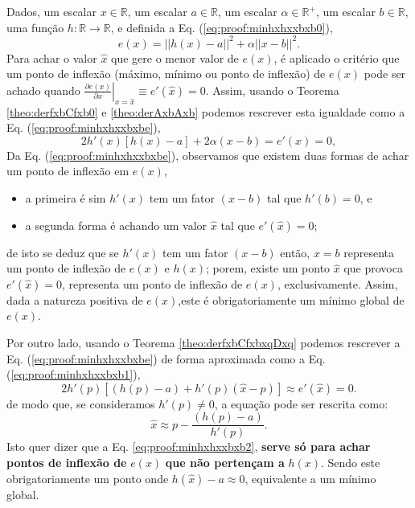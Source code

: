 \begin{myproofT}\label{proof:theo:minhxhxxbxb}
Dados,
um escalar $x \in \mathbb{R}$, 
um escalar $a \in \mathbb{R}$,
um escalar $\alpha \in \mathbb{R}^{+}$,
um escalar $b \in \mathbb{R}$,
uma função $h:\mathbb{R} \rightarrow \mathbb{R}$, e 
definida a Eq. (\ref{eq:proof:minhxhxxbxb0}),
\begin{equation}\label{eq:proof:minhxhxxbxb0}
e(x)=||h(x)-a||^2+\alpha ||x-b||^2.
\end{equation}
Para achar o valor  $\hat{x}$ que gere o menor valor de $e(x)$, é aplicado
o critério que um ponto de inflexão (máximo, mínimo ou ponto de inflexão) de $e(x)$ pode ser achado quando 
$\left. \frac{\partial e(x)}{\partial x }\right|_{x=\hat{x}} \equiv e'(\hat{x}) =0$.
Assim, 
usando o Teorema \ref{theo:derfxbCfxb0} e \ref{theo:derAxbAxb} podemos 
rescrever esta igualdade como a Eq. (\ref{eq:proof:minhxhxxbxbe}),
\begin{equation}\label{eq:proof:minhxhxxbxbe}
2  h'(x) \left[h(x) -a\right]+2\alpha (x-b)= e'(x)=0,
\end{equation}
Da Eq. (\ref{eq:proof:minhxhxxbxbe}), observamos 
que existem duas formas de achar um ponto de inflexão em $e(x)$,
\begin{itemize}
 \item a primeira é sim $h'(x)$ tem um fator $(x-b)$ tal que $h'(b)=0$, e
 \item a segunda forma é achando um valor $\hat{x}$ tal que $e'(\hat{x})=0$;
\end{itemize}
de isto se deduz que se $h'(x)$ tem um fator $(x-b)$ então, $x=b$ representa um ponto de inflexão de $e(x)$ e $h(x)$;
porem, existe um ponto $\hat{x}$ que provoca $e'(\hat{x})=0$, representa um ponto de inflexão de $e(x)$, exclusivamente. 
Assim, dada a natureza positiva de $e(x)$,este é obrigatoriamente um mínimo global de $e(x)$.

Por outro lado, usando o Teorema \ref{theo:derfxbCfxbxqDxq} podemos 
rescrever a Eq. (\ref{eq:proof:minhxhxxbxbe}) de forma aproximada como a Eq. (\ref{eq:proof:minhxhxxbxb1}),
\begin{equation}\label{eq:proof:minhxhxxbxb1}
2  h'(p) \left[\left(h(p)-a\right) + h'(p) \left(\hat{x} - p\right)\right] \approx
e'(\hat{x})=0.
\end{equation}
de modo que, se consideramos $h'(p)\neq 0$, a equação pode ser rescrita como:
\begin{equation}\label{eq:proof:minhxhxxbxb2}
\hat{x} \approx p - \frac{\left(h(p)-a\right)}{h'(p)}.
\end{equation}
Isto quer dizer que a Eq. \ref{eq:proof:minhxhxxbxb2}, \textbf{serve só para
achar pontos de inflexão de} $e(x)$ \textbf{que não pertençam a} $h(x)$.
Sendo este obrigatoriamente um ponto onde $h(\hat{x})-a\approx 0$, 
equivalente a um mínimo global.


\end{myproofT}
